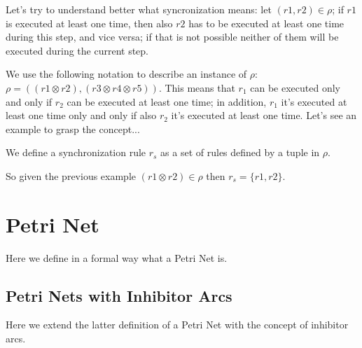 Let's try to understand better what syncronization means:
let $(r1,r2) \in \rho$; if $r1$ is executed at least one time, then also
$r2$ has to be executed at least one time during this step, and vice versa; if that is not possible neither of them will be executed during the current step.

We use the following notation to describe an instance of $\rho$: 
$\rho=((r1 \otimes r2),(r3 \otimes r4 \otimes r5))$.
This means that $r_1$ can be executed only and only if $r_2$ can be executed at least one time;
in addition, $r_1$ it's executed at least one time only and only if also $r_2$ it's executed at least one time.
Let's see an example to grasp the concept...

\begin{definition}
\label{def:sync_rule}
We define a synchronization rule $r_s$ as a set of rules defined by a tuple in $\rho$.
\end{definition}

So given the previous example $(r1 \otimes r2) \in \rho$ then $r_s=\{r1,r2\}$.

\section{Petri Net}

Here we define in a formal way what a Petri Net is.

\subsection{Petri Nets with Inhibitor Arcs}

Here we extend the latter definition of a Petri Net with the concept of inhibitor arcs.